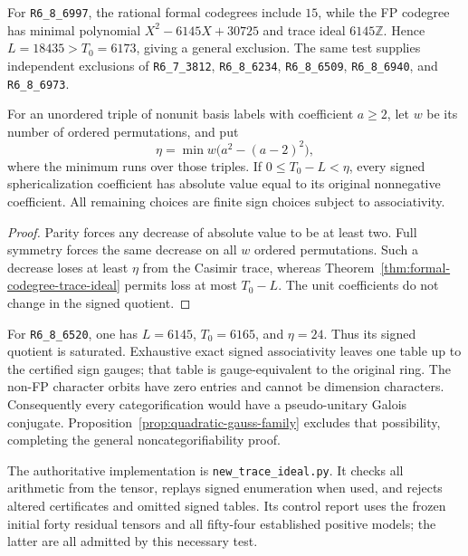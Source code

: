 For \texttt{R6\_8\_6997}, the rational formal codegrees include $15$, while
the FP codegree has minimal polynomial $X^2-6145X+30725$ and trace ideal
$6145\mathbb Z$.  Hence $L=18435>T_0=6173$, giving a general exclusion.
The same test supplies independent exclusions of
\texttt{R6\_7\_3812}, \texttt{R6\_8\_6234}, \texttt{R6\_8\_6509},
\texttt{R6\_8\_6940}, and \texttt{R6\_8\_6973}.

\begin{corollary}
\label{cor:trace-ideal-saturation}
For an unordered triple of nonunit basis labels with coefficient $a\ge2$,
let $w$ be its number of ordered permutations, and put
\[
\eta=\min w\bigl(a^2-(a-2)^2\bigr),
\]
where the minimum runs over those triples.  If $0\le T_0-L<\eta$, every
signed sphericalization coefficient has absolute value equal to its
original nonnegative coefficient.  All remaining choices are finite sign
choices subject to associativity.
\end{corollary}
\begin{proof}
Parity forces any decrease of absolute value to be at least two.  Full
symmetry forces the same decrease on all $w$ ordered permutations.  Such a
decrease loses at least $\eta$ from the Casimir trace, whereas
Theorem~\ref{thm:formal-codegree-trace-ideal} permits loss at most $T_0-L$.
The unit coefficients do not change in the signed quotient.
\end{proof}

For \texttt{R6\_8\_6520}, one has $L=6145$, $T_0=6165$, and $\eta=24$.
Thus its signed quotient is saturated.  Exhaustive exact signed associativity
leaves one table up to the certified sign gauges; that table is gauge-equivalent
to the original ring.  The non-FP character orbits have zero entries and cannot
be dimension characters.  Consequently every categorification would have a
pseudo-unitary Galois conjugate.  Proposition~\ref{prop:quadratic-gauss-family}
excludes that possibility, completing the general noncategorifiability proof.

The authoritative implementation is \texttt{new\_trace\_ideal.py}.  It checks
all arithmetic from the tensor, replays signed enumeration when used, and
rejects altered certificates and omitted signed tables.  Its control report
uses the frozen initial forty residual tensors and all fifty-four established
positive models; the latter are all admitted by this necessary test.
